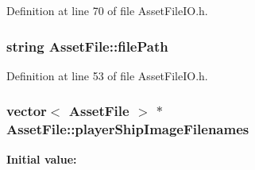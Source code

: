 Definition at line 70 of file Asset\-File\-I\-O.\-h.

\hypertarget{struct_asset_file_a25c3567f452df062ea7dcee79c0aefde}{
\subsubsection[{file\-Path}]{\setlength{\rightskip}{0pt plus 5cm}string Asset\-File\-::file\-Path\hspace{0.3cm}{\ttfamily [protected]}}}\label{struct_asset_file_a25c3567f452df062ea7dcee79c0aefde}


Definition at line 53 of file Asset\-File\-I\-O.\-h.

\hypertarget{struct_asset_file_a2e2753d8110ad1c4726f724e15f5b831}{
\subsubsection[{player\-Ship\-Image\-Filenames}]{\setlength{\rightskip}{0pt plus 5cm}vector$<$ {\bf Asset\-File} $>$ $\ast$ Asset\-File\-::player\-Ship\-Image\-Filenames\hspace{0.3cm}{\ttfamily [static]}}}\label{struct_asset_file_a2e2753d8110ad1c4726f724e15f5b831}
{\bfseries Initial value\-:}
